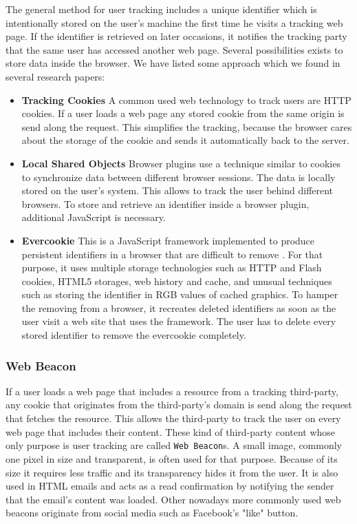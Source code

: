 	The general method for user tracking includes a unique identifier which is intentionally stored on the user's machine the first time he visits a tracking web page. If the identifier is retrieved on later occasions, it notifies the tracking party that the same user has accessed another web page. Several possibilities exists to store data inside the browser. We have listed some approach which we found in several research papers:
		
	\begin{itemize}
		\item \textbf{Tracking Cookies} A common used web technology to track users are HTTP cookies. If a user loads a web page any stored cookie from the same origin is send along the request. This simplifies the tracking, because the browser cares about the storage of the cookie and sends it automatically back to the server.
		
		\item \textbf{Local Shared Objects} Browser plugins use a technique similar to cookies to synchronize data between different browser sessions. The data is locally stored on the user's system. This allows to track the user behind different browsers. To store and retrieve an identifier inside a browser plugin, additional JavaScript is necessary.
		
		\item \textbf{Evercookie} This is a JavaScript framework implemented to produce persistent identifiers in a browser that are difficult to remove \cite{evercookie}. For that purpose, it uses multiple storage technologies such as HTTP and Flash cookies, HTML5 storages, web history and cache, and unusual techniques such as storing the identifier in RGB values of cached graphics. To hamper the removing from a browser, it recreates deleted identifiers as soon as the user visit a web site that uses the framework. The user has to delete every stored identifier to remove the evercookie completely. 
	\end{itemize}
	
\subsubsection{Web Beacon}
\label{sec:webBeacon}
	
	If a user loads a web page that includes a resource from a tracking third-party, any cookie that originates from the third-party's domain is send along the request that fetches the resource. This allows the third-party to track the user on every web page that includes their content. These kind of third-party content whose only purpose is user tracking are called \texttt{Web Beacon}s. A small image, commonly one pixel in size and transparent, is often used for that purpose. Because of its size it requires less traffic and its transparency hides it from the user. It is also used in HTML emails and acts as a read confirmation by notifying the sender that the email's content was loaded. Other nowadays more commonly used web beacons originate from social media such as Facebook's "like" button. 
	
